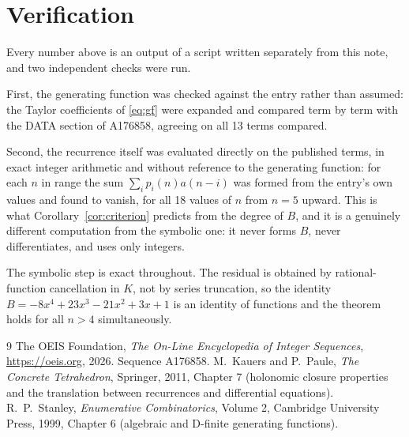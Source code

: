 \documentclass[11pt,a4paper]{article}
\theoremstyle{plain}
\theoremstyle{definition}
\begin{document}
\section{Verification}

Every number above is an output of a script written separately from this note, and two
independent checks were run.

First, the generating function was checked against the entry rather than assumed: the
Taylor coefficients of \eqref{eq:gf} were expanded and compared term by term with the DATA
section of A176858, agreeing on all 13 terms compared.

Second, the recurrence itself was evaluated directly on the published terms, in exact
integer arithmetic and without reference to the generating function: for each $n$ in range
the sum $\sum_{i}p_{i}(n)a(n-i)$ was formed from the entry's own values and found to
vanish, for all 18 values of $n$ from $n=5$ upward. This is what
Corollary~\ref{cor:criterion} predicts from the degree of $B$, and it is a genuinely
different computation from the symbolic one: it never forms $B$, never differentiates, and
uses only integers.

The symbolic step is exact throughout. The residual is obtained by rational-function
cancellation in $K$, not by series truncation, so the identity $B=- 8 x^{4} + 23 x^{3} - 21 x^{2} + 3 x + 1$ is an
identity of functions and the theorem holds for all $n>4$ simultaneously.

\begin{thebibliography}{9}
 The OEIS Foundation, \emph{The On-Line Encyclopedia of Integer Sequences},
\url{https://oeis.org}, 2026. Sequence A176858.
 M.~Kauers and P.~Paule, \emph{The Concrete Tetrahedron}, Springer, 2011,
Chapter 7 (holonomic closure properties and the translation between recurrences and
differential equations).
 R.~P.~Stanley, \emph{Enumerative Combinatorics}, Volume 2, Cambridge
University Press, 1999, Chapter 6 (algebraic and D-finite generating functions).
\end{thebibliography}
\end{document}
